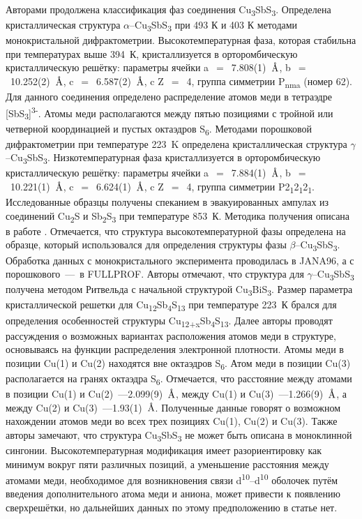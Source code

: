 Авторами \cite{Pfitzner1998a} продолжена классификация фаз соединения Cu\textsubscript{3}SbS\textsubscript{3}. Определена кристаллическая структура $\alpha$--Cu\textsubscript{3}SbS\textsubscript{3} при 493 К и 403 К методами монокристальной дифрактометрии. Высокотемпературная фаза, которая стабильна при температурах выше 394~К, кристаллизуется в орторомбическую кристаллическую решётку: параметры ячейки a~$=$~7.808(1)~$\mbox{\normalfont\AA}$, b~$=$~10.252(2)~$\mbox{\normalfont\AA}$, c~$=$~6.587(2)~$\mbox{\normalfont\AA}$,  c Z~$=$~4, группа симметрии P\textsubscript{nma} (номер 62). Для данного соединения определено распределение атомов меди в тетраэдре [SbS\textsubscript{3}]\textsuperscript{3-}.  Атомы меди располагаются между пятью позициями с тройной или четверной координацией и пустых октаэдров S\textsubscript{6}.  Методами порошковой дифрактометрии при температуре 223~K определена кристаллическая структура $\gamma$--Cu\textsubscript{3}SbS\textsubscript{3}. Низкотемпературная фаза кристаллизуется в орторомбическую кристаллическую решётку: параметры ячейки a~$=$~7.884(1)~$\mbox{\normalfont\AA}$, b~$=$~10.221(1)~$\mbox{\normalfont\AA}$, c~$=$~6.624(1)~$\mbox{\normalfont\AA}$,  c Z~$=$~4, группа симметрии P2\textsubscript{1}2\textsubscript{1}2\textsubscript{1}. Исследованные образцы получены спеканием в эвакуированных ампулах из соединений Cu\textsubscript{2}S и Sb\textsubscript{2}S\textsubscript{3} при температуре 853~К. Методика получения описана в работе \cite{Pfitzner_1994}. Отмечается, что структура высокотемпературной фазы определена на образце,  который использовался для определения структуры фазы $\beta$--Cu\textsubscript{3}SbS\textsubscript{3}. Обработка данных с монокристального эксперимента проводилась в JANA96, а с порошкового~---~в FULLPROF. Авторы отмечают, что структура для $\gamma$--Cu\textsubscript{3}SbS\textsubscript{3} получена методом Ритвельда с начальной структурой Cu\textsubscript{3}BiS\textsubscript{3}. Размер параметра кристаллической решетки для Cu\textsubscript{12}Sb\textsubscript{4}S\textsubscript{13} при температуре 223~К брался для определения особенностей структуры Cu\textsubscript{12+x}Sb\textsubscript{4}S\textsubscript{13}. Далее авторы проводят рассуждения о возможных вариантах расположения атомов меди в структуре, основываясь на  функции распределения электронной плотности. Атомы меди в позиции Cu(1) и Cu(2) находятся вне октаэдров S\textsubscript{6}. Атом меди в позиции Cu(3) располагается на гранях октаэдра  S\textsubscript{6}. Отмечается, что расстояние между атомами в позиции Cu(1) и Cu(2)~---2.099(9)~$\mbox{\normalfont\AA}$, между  Cu(1) и Cu(3)~---1.266(9)~$\mbox{\normalfont\AA}$, а между Cu(2) и Cu(3)~---1.93(1)~$\mbox{\normalfont\AA}$. Полученные данные говорят о возможном нахождении атомов меди во всех трех позициях Cu(1), Cu(2) и Cu(3). Также авторы замечают, что структура Cu\textsubscript{3}SbS\textsubscript{3} не может быть описана в моноклинной сингонии. Высокотемпературная модификация имеет разориентировку как минимум вокруг пяти различных позиций, а уменьшение расстояния между атомами меди, необходимое для возникновения связи d\textsuperscript{10}--d\textsuperscript{10} оболочек путём введения дополнительного атома меди и аниона, может привести к появлению сверхрешётки, но дальнейших данных по этому предположению в статье нет.


